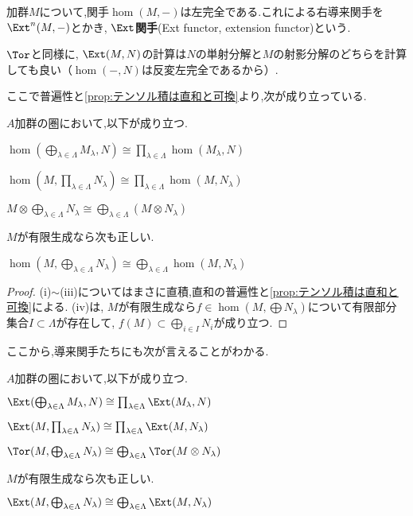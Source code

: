 \begin{defi}[$\Ext$関手]
	加群$M$について,関手$\hom(M,-)$は左完全である.これによる右導来関手を$\Ext^n(M,-)$とかき, $\Ext$\textbf{関手}(Ext functor, extension functor)という.
\end{defi}

$\Tor$と同様に, $\Ext(M,N)$の計算は$N$の単射分解と$M$の射影分解のどちらを計算しても良い（$\hom(-,N)$は反変左完全であるから）.

ここで普遍性と\ref{prop:テンソル積は直和と可換}より,次が成り立っている.

\begin{prop}
	$A$加群の圏において,以下が成り立つ.
	\begin{sakura}
		\item $\hom(\bigoplus_{\lambda\in\Lambda} M_\lambda,N)\cong\prod_{\lambda\in\Lambda}\hom(M_\lambda,N)$
		\item $\hom(M,\prod_{\lambda\in\Lambda}N_\lambda)\cong\prod_{\lambda\in\Lambda}\hom(M,N_\lambda)$
		\item $M\otimes\bigoplus_{\lambda\in\Lambda}N_\lambda\cong\bigoplus_{\lambda\in\Lambda}(M\otimes N_\lambda)$
	\end{sakura}
	$M$が有限生成なら次も正しい.
	\begin{sakura}\setcounter{enumi}{3}
		\item $\hom(M,\bigoplus_{\lambda\in\Lambda}N_\lambda)\cong\bigoplus_{\lambda\in\Lambda}\hom(M,N_\lambda)$
	\end{sakura}
\end{prop}

\begin{proof}
	(i)$\sim$(iii)についてはまさに直積,直和の普遍性と\ref{prop:テンソル積は直和と可換}による. (iv)は, $M$が有限生成なら$f\in\hom(M,\bigoplus N_\lambda)$について有限部分集合$I\subset\Lambda$が存在して, $f(M)\subset\bigoplus_{i\in I} N_i$が成り立つ.
\end{proof}

ここから,導来関手たちにも次が言えることがわかる.

\begin{prop}\label{prop:Tor,Extと直和,直積}
	$A$加群の圏において,以下が成り立つ.
	\begin{sakura}
		\item $\Ext(\bigoplus_{\lambda\in\Lambda} M_\lambda,N)\cong\prod_{\lambda\in\Lambda}\Ext(M_\lambda,N)$
		\item $\Ext(M,\prod_{\lambda\in\Lambda}N_\lambda)\cong\prod_{\lambda\in\Lambda}\Ext(M,N_\lambda)$
		\item $\Tor(M,\bigoplus_{\lambda\in\Lambda}N_\lambda)\cong\bigoplus_{\lambda\in\Lambda}\Tor(M\otimes N_\lambda)$
	\end{sakura}
	$M$が有限生成なら次も正しい.
	\begin{sakura}\setcounter{enumi}{3}
		\item $\Ext(M,\bigoplus_{\lambda\in\Lambda}N_\lambda)\cong\bigoplus_{\lambda\in\Lambda}\Ext(M,N_\lambda)$
	\end{sakura}
\end{prop}

